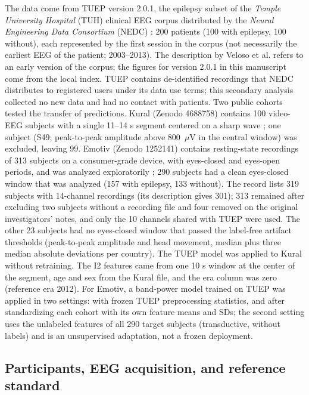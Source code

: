 The data come from TUEP version 2.0.1, the epilepsy subset of the \textit{Temple University Hospital} (TUH) clinical EEG corpus distributed by the \textit{Neural Engineering Data Consortium} (NEDC) \cite{veloso2017,obeid2016}: 200 patients (100 with epilepsy, 100 without), each represented by the first session in the corpus (not necessarily the earliest EEG of the patient; 2003--2013). The description by Veloso et al. refers to an early version of the corpus; the figures for version 2.0.1 in this manuscript come from the local index.
TUEP contains de-identified recordings that NEDC distributes to registered users under its data use terms; this secondary analysis collected no new data and had no contact with patients. 
Two public cohorts tested the transfer of predictions. Kural (Zenodo 4688758) contains 100 video-EEG subjects with a single 11--14 s segment centered on a sharp wave \cite{kural2020}; one subject (S49; peak-to-peak amplitude above 800~$\mu$V in the central window) was excluded, leaving 99. Emotiv (Zenodo 1252141) contains resting-state recordings of 313 subjects on a consumer-grade device, with eyes-closed and eyes-open periods, and was analyzed exploratorily \cite{vanhees2018}; 290 subjects had a clean eyes-closed window that was analyzed (157 with epilepsy, 133 without). The record lists 319 subjects with 14-channel recordings (its description gives 301); 313 remained after excluding two subjects without a recording file and four removed on the original investigators' notes, and only the 10 channels shared with TUEP were used. The other 23 subjects had no eyes-closed window that passed the label-free artifact thresholds (peak-to-peak amplitude and head movement, median plus three median absolute deviations per country). The TUEP model was applied to Kural without retraining. The I2 features came from one 10 s window at the center of the segment, age and sex from the Kural file, and the era column was zero (reference era 2012). For Emotiv, a band-power model trained on TUEP was applied in two settings: with frozen TUEP preprocessing statistics, and after standardizing each cohort with its own feature means and SDs; the second setting uses the unlabeled features of all 290 target subjects (transductive, without labels) and is an unsupervised adaptation, not a frozen deployment.

\subsection{Participants, EEG acquisition, and reference standard}\label{sec:partisipan}

